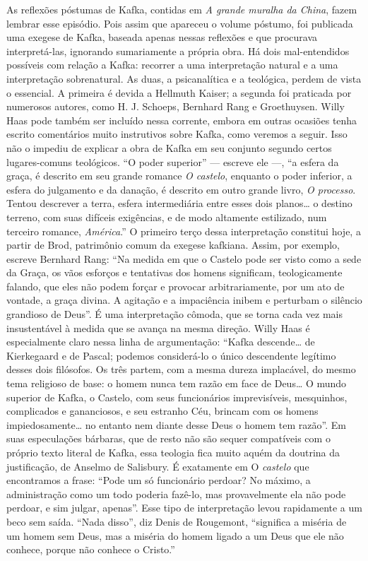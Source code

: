 As reflexões póstumas de Kafka, contidas em \textit{A grande muralha da China},
fazem lembrar esse episódio. Pois assim que apareceu o volume póstumo,
foi publicada uma exegese de Kafka, baseada apenas nessas reflexões e
que procurava interpretá-las, ignorando sumariamente a própria obra. Há
dois mal-entendidos possíveis com relação a Kafka: recorrer a uma
interpretação natural e a uma interpretação sobrenatural. As duas, a
psicanalítica e a teológica, perdem de vista o essencial. A primeira é
devida a Hellmuth Kaiser; a segunda foi praticada por numerosos autores,
como H. J. Schoeps, Bernhard Rang e Groethuysen. Willy Haas pode também
ser incluído nessa corrente, embora em outras ocasiões tenha escrito
comentários muito instrutivos sobre Kafka, como veremos a seguir. Isso
não o impediu de explicar a obra de Kafka em seu conjunto segundo certos
lugares-comuns teológicos. ``O poder superior'' --- escreve ele ---, ``a
esfera da graça, é descrito em seu grande romance \textit{O castelo}, enquanto
o poder inferior, a esfera do julgamento e da danação, é descrito em
outro grande livro, \textit{O processo}. Tentou descrever a terra, esfera
intermediária entre esses dois planos\ldots{} o destino terreno, com suas
difíceis exigências, e de modo altamente estilizado, num terceiro
romance, \textit{América}.'' O primeiro terço dessa interpretação constitui
hoje, a partir de Brod, patrimônio comum da exegese kafkiana. Assim, por
exemplo, escreve Bernhard Rang: ``Na medida em que o Castelo pode ser
visto como a sede da Graça, os vãos esforços e tentativas dos homens
significam, teologicamente falando, que eles não podem forçar e provocar
arbitrariamente, por um ato de vontade, a graça divina. A agitação e a
impaciência inibem e perturbam o silêncio grandioso de Deus''. É uma
interpretação cômoda, que se torna cada vez mais insustentável à medida
que se avança na mesma direção. Willy Haas é especialmente claro nessa
linha de argumentação: ``Kafka descende\ldots{} de Kierkegaard e de Pascal;
podemos considerá-lo o único descendente legítimo desses dois filósofos.
Os três partem, com a mesma dureza implacável, do mesmo tema religioso
de base: o homem nunca tem razão em face de Deus\ldots{} O mundo superior de
Kafka, o Castelo, com seus funcionários imprevisíveis, mesquinhos,
complicados e gananciosos, e seu estranho Céu, brincam com os homens
impiedosamente\ldots{} no entanto nem diante desse Deus o homem tem razão''.
Em suas especulações bárbaras, que de resto não são sequer compatíveis
com o próprio texto literal de Kafka, essa teologia fica muito aquém da
doutrina da justificação, de Anselmo de Salisbury. É exatamente em O
\textit{castelo} que encontramos a frase: ``Pode um só funcionário perdoar? No
máximo, a administração como um todo poderia fazê-lo, mas provavelmente
ela não pode perdoar, e sim julgar, apenas''. Esse tipo de interpretação
levou rapidamente a um beco sem saída. ``Nada disso'', diz Denis de
Rougemont, ``significa a miséria de um homem sem Deus, mas a miséria do
homem ligado a um Deus que ele não conhece, porque não conhece o
Cristo.''

